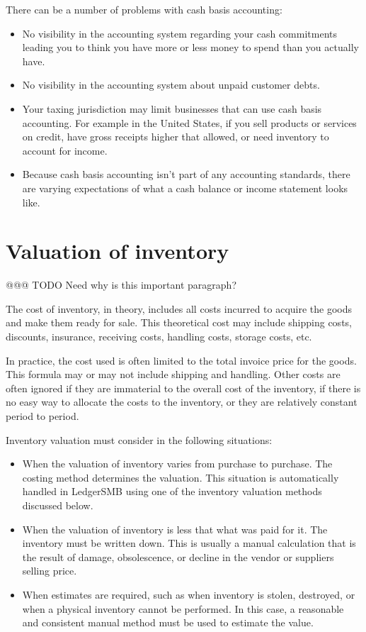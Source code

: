 There can be a number of problems with \gls{cash basis} accounting:
\begin{itemize}
        \item No visibility in the accounting system regarding your cash commitments leading
        you to think you have more or less money to spend than you actually have.
        \item No visibility in the accounting system about unpaid customer debts.
        \item Your taxing jurisdiction may limit businesses that can use cash basis accounting.
        For example in the United States, if you sell products or services on credit,
        have gross receipts higher that allowed, or need inventory to account for income.
        \item  Because cash basis accounting isn't part of any accounting standards, there are varying expectations of what a cash balance or income statement looks like.
\end{itemize}

\section{Valuation of inventory}
\label{sec-accounting-valuation-inventory}

@@@ TODO Need why is this important paragraph?

The cost of inventory, in theory, includes all costs incurred to acquire the goods and make 
them ready for sale. This theoretical cost may include shipping costs, discounts, insurance, 
receiving costs, handling costs, storage costs, etc.

In practice, the cost used is often limited to the total invoice price for the goods.
This formula may or may not include shipping and handling.
Other costs are often ignored if they are immaterial to the overall cost of the inventory, if there
is no easy way to allocate the costs to the inventory, or they are relatively constant period to period.

Inventory valuation must consider in the following situations:
\begin{itemize}
        \item When the valuation of inventory varies from purchase to purchase. The costing method
        determines the valuation.  This situation is automatically handled in LedgerSMB using one of the
        inventory valuation methods discussed below.
        \item When the valuation of inventory is less that what was paid for it. The inventory must
        be written down. This is usually a manual calculation that is the result of damage, obsolescence, 
        or decline in the vendor or suppliers selling price.
        \item When estimates are required, such as when inventory is stolen, destroyed, or when a physical inventory
        cannot be performed. In this case, a reasonable and consistent manual method must be used to 
        estimate the value. 
\end{itemize}

